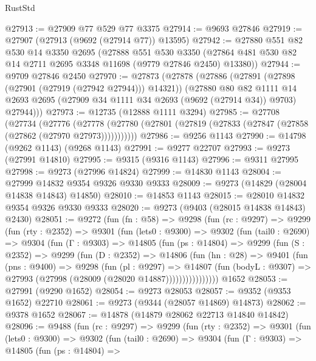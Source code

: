 \begin{lexlean}{RustStd}
\begin{coremodule}
@27913 := @27909 @77 @529 @77 @3375
@27914 := @9693 @27846
@27919 := @27907 (@27913 (@9692 (@27914 @77)) @13595)
@27942 := @27880
    @551
    @82
    @530
    @14
    @3350
    @2695
    (@27888
      @551
      @530
      @3350
      (@27864 @481 @530 @82 @14 @2711 @2695 @3348 @11698 (@9779 @27846 @2450) @13380))
@27944 := @9709 @27846 @2450
@27970 := @27873
    (@27878
      (@27886
        (@27891 (@27898 (@27901 (@27919 (@27942 @27944))) @14321))
        (@27880
          @80
          @82
          @1111
          @14
          @2693
          @2695
          (@27909 @34 @1111 @34 @2693 (@9692 (@27914 @34)) @9703)
          @27944)))
@27973 := @12735 (@12888 @1111 @3294)
@27985 := @27708
    (@27734
      (@27776
        (@27778 (@27780 (@27801 (@27819 (@27833 (@27847 (@27858 (@27862 (@27970 @27973)))))))))))
@27986 := @9256 @1143
@27990 := @14798 (@9262 @1143) (@9268 @1143)
@27991 := @9277 @22707
@27993 := @9273 (@27991 @14810)
@27995 := @9315 (@9316 @1143)
@27996 := @9311 @27995
@27998 := @9273 (@27996 @14824)
@27999 := @14830 @1143
@28004 := @27999 @14832 @9354 @9326 @9330 @9333
@28009 := @9273 (@14829 (@28004 @14838 @14843) @14850)
@28010 := @14853 @1143
@28015 := @28010 @14832 @9354 @9326 @9330 @9333
@28020 := @9273 (@9403 (@28015 @14838 @14843) @2430)
@28051 := @9272
    (fun (fn : @58) =>
    @9298
      (fun (rc : @9297) =>
      @9299
        (fun (rty : @2352) =>
        @9301
          (fun (lets0 : @9300) =>
          @9302
            (fun (tail0 : @2690) =>
            @9304
              (fun (Γ : @9303) =>
              @14805
                (fun (ps : @14804) =>
                @9299
                  (fun (S : @2352) =>
                  @9299
                    (fun (D : @2352) =>
                    @14806
                      (fun (hn : @28) =>
                      @9401
                        (fun (pns : @9400) =>
                        @9298
                          (fun (pl : @9297) =>
                          @14807
                            (fun (bodyL : @9307) =>
                            @27993 (@27998 (@28009 (@28020 @14887))))))))))))))))
    @1652
@28053 := @27991 (@9290 @1652)
@28054 := @9273 @28053
@28057 := @9352 (@9353 @1652) @22710
@28061 := @9273 (@9344 (@28057 @14869) @14873)
@28062 := @9378 @1652
@28067 := @14878 (@14879 @28062 @22713 @14840 @14842)
@28096 := @9488
    (fun (rc : @9297) =>
    @9299
      (fun (rty : @2352) =>
      @9301
        (fun (lets0 : @9300) =>
        @9302
          (fun (tail0 : @2690) =>
          @9304
            (fun (Γ : @9303) =>
            @14805
              (fun (ps : @14804) =>

\end{coremodule}
\end{lexlean}
